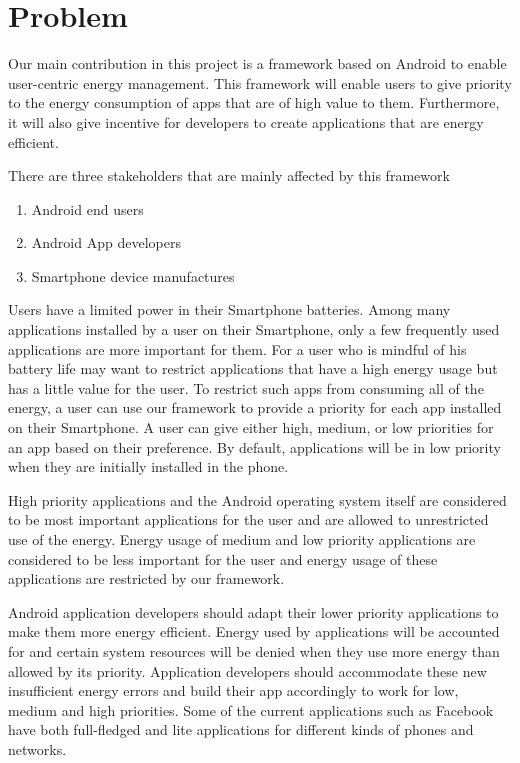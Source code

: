 \section{Problem}
\label{motivation}

Our main contribution in this project is a framework based on Android to enable user-centric energy management. This framework will enable users to give priority to the energy consumption of apps that are of high value to them. Furthermore, it will also give incentive for developers to create applications that are energy efficient. 


There are three stakeholders that are mainly affected by this framework

\begin{enumerate}

\item Android end users
\item Android App developers
\item Smartphone device manufactures

\end{enumerate}

Users have a limited power in their Smartphone batteries. Among many applications installed by a user on their Smartphone, only a few frequently used applications are more important for them. For a user who is mindful of his battery life may want to restrict applications that have a high energy usage but has a little value for the user. To restrict such apps from consuming all of the energy, a user can use our framework to provide a priority for each app installed on their Smartphone. A user can give either high, medium, or low priorities for an app based on their preference. By default, applications will be in low priority when they are initially installed in the phone. 

High priority applications and the Android operating system itself are considered to be most important applications for the user and are allowed to unrestricted use of the energy. Energy usage of medium and low priority applications are considered to be less important for the user and energy usage of these applications are restricted by our framework. 

Android application developers should adapt their lower priority applications to make them more energy efficient. Energy used by applications will be accounted for and certain system resources will be denied when they use more energy than allowed by its priority. Application developers should accommodate these new insufficient energy errors and build their app accordingly to work for low, medium and high priorities. Some of the current applications such as Facebook have both full-fledged and lite applications for different kinds of phones and networks.


